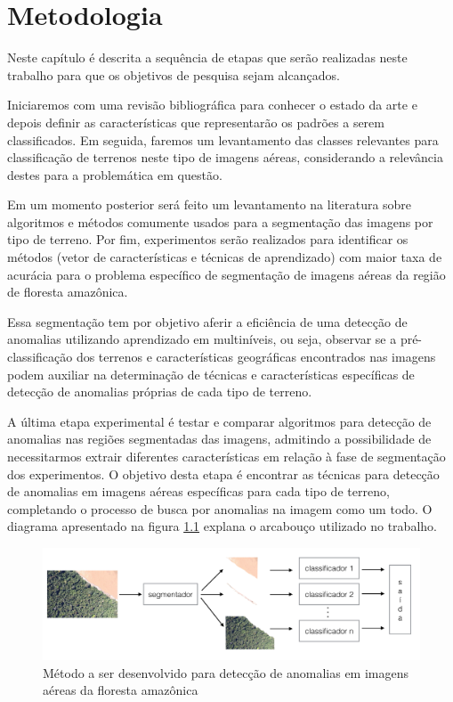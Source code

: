 \chapter{Metodologia}\label{cap:metodologia}

Neste capítulo é descrita a sequência de etapas que serão realizadas neste trabalho para que os objetivos de pesquisa sejam alcançados. 

Iniciaremos com uma revisão bibliográfica para conhecer o estado da arte e depois definir as características que representarão os padrões a serem classificados. Em seguida, faremos um levantamento das classes relevantes para classificação de terrenos neste tipo de imagens aéreas, considerando a relevância destes para a problemática em questão.

Em um momento posterior será feito um levantamento na literatura sobre algoritmos e métodos comumente usados para a segmentação das imagens por tipo de terreno. Por fim, experimentos serão realizados para identificar os métodos (vetor de características e técnicas de aprendizado) com maior taxa de acurácia para o problema específico de segmentação de imagens aéreas da região de floresta amazônica.

Essa segmentação tem por objetivo aferir a eficiência de uma detecção de anomalias utilizando aprendizado em multiníveis, ou seja, observar se a pré-classificação dos terrenos e características geográficas encontrados nas imagens podem auxiliar na determinação de técnicas e características específicas de detecção de anomalias próprias de cada tipo de terreno.

A última etapa experimental é testar e comparar algoritmos para detecção de anomalias nas regiões segmentadas das imagens, admitindo a possibilidade de necessitarmos extrair diferentes características em relação à fase de segmentação dos experimentos. O objetivo desta etapa é encontrar as técnicas para detecção de anomalias em imagens aéreas específicas para cada tipo de terreno, completando o processo de busca por anomalias na imagem como um todo. O diagrama apresentado na figura \ref{fig:metDiagrama} explana o arcabouço utilizado no trabalho.

\begin{figure}[h]
    \includegraphics[width=\textwidth]{imgs/diagrama}
    \caption{Método a ser desenvolvido para detecção de anomalias em imagens aéreas da floresta amazônica}
    \label{fig:metDiagrama}
\end{figure}

